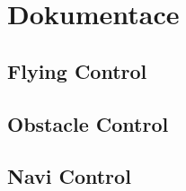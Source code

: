 \chapter{Dokumentace}
\label{user-guide}


\section{Flying Control}
\label{installation-manual}


\section{Obstacle Control}

\section{Navi Control}